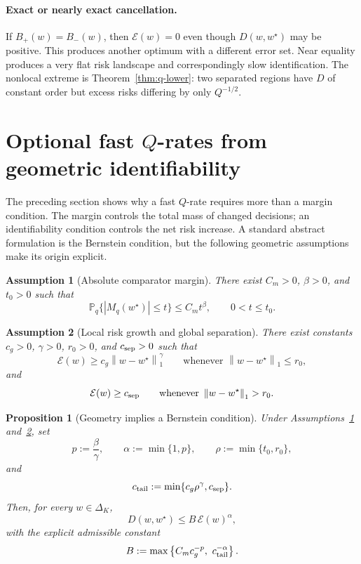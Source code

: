 \documentclass[11pt]{article}
\newtheorem{proposition}{Proposition}
\newtheorem{assumption}{Assumption}
\newcommand{\Pp}{\mathbb P}
\newcommand{\wstar}{w^\star}
\newcommand{\norm}[1]{\left\lVert #1\right\rVert}
\begin{document}
\paragraph{Exact or nearly exact cancellation.}
If $B_+(w)=B_-(w)$, then $\mathcal E(w)=0$ even though $D(w,\wstar)$ may be positive.  This produces another optimum with a different error set.  Near equality produces a very flat risk landscape and correspondingly slow identification.  The nonlocal extreme is Theorem~\ref{thm:q-lower}: two separated regions have $D$ of constant order but excess risks differing by only $Q^{-1/2}$.

\section{Optional fast $Q$-rates from geometric identifiability}
\label{sec:fast}

The preceding section shows why a fast $Q$-rate requires more than a margin condition.  The margin controls the total mass of changed decisions; an identifiability condition controls the net risk increase.  A standard abstract formulation is the Bernstein condition, but the following geometric assumptions make its origin explicit.

\begin{assumption}[Absolute comparator margin]
\label{ass:absolute-margin}
There exist $C_m>0$, $\beta>0$, and $t_0>0$ such that
\[
\Pp_q\{|M_q(\wstar)|\le t\}
\le
C_m t^\beta,
\qquad 0<t\le t_0.
\]
\end{assumption}

\begin{assumption}[Local risk growth and global separation]
\label{ass:growth}
There exist constants $c_g>0$, $\gamma>0$, $r_0>0$, and $c_{\rm sep}>0$ such that
\[
\mathcal E(w)
\ge
c_g\norm{w-\wstar}_1^\gamma
\qquad
\text{whenever }\norm{w-\wstar}_1\le r_0,
\]
and
\[
\mathcal E(w)
\ge c_{\rm sep}
\qquad
\text{whenever }\norm{w-\wstar}_1>r_0.
\]
\end{assumption}

\begin{proposition}[Geometry implies a Bernstein condition]
\label{prop:geom-bernstein}
Under Assumptions~\ref{ass:absolute-margin} and~\ref{ass:growth}, set
\[
p:=\frac{\beta}{\gamma},
\qquad
\alpha:=\min\{1,p\},
\qquad
\rho:=\min\{t_0,r_0\},
\]
and
\[
c_{\rm tail}:=\min\{c_g\rho^\gamma,c_{\rm sep}\}.
\]
Then, for every $w\in\Delta_K$,
\[
D(w,\wstar)
\le
B\,\mathcal E(w)^\alpha,
\]
with the explicit admissible constant
\[
B
:=
\max\left\{
C_m c_g^{-p},
\ c_{\rm tail}^{-\alpha}
\right\}.
\]
\end{proposition}
\end{document}
